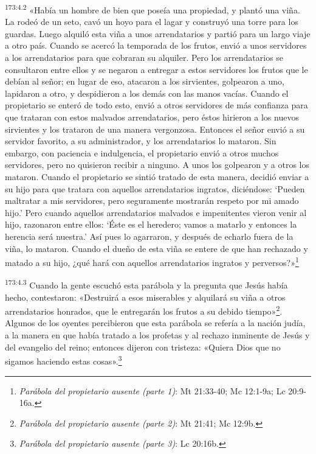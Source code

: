 \par
\textsuperscript{173:4.2} «Había un hombre de bien que poseía una propiedad, y plantó una viña. La rodeó de un seto, cavó un hoyo para el lagar y construyó una torre para los guardas. Luego alquiló esta viña a unos arrendatarios y partió para un largo viaje a otro país. Cuando se acercó la temporada de los frutos, envió a unos servidores a los arrendatarios para que cobraran su alquiler. Pero los arrendatarios se consultaron entre ellos y se negaron a entregar a estos servidores los frutos que le debían al señor; en lugar de eso, atacaron a los sirvientes, golpearon a uno, lapidaron a otro, y despidieron a los demás con las manos vacías. Cuando el propietario se enteró de todo esto, envió a otros servidores de más confianza para que trataran con estos malvados arrendatarios, pero éstos hirieron a los nuevos sirvientes y los trataron de una manera vergonzosa. Entonces el señor envió a su servidor favorito, a su administrador, y los arrendatarios lo mataron. Sin embargo, con paciencia e indulgencia, el propietario envió a otros muchos servidores, pero no quisieron recibir a ninguno. A unos los golpearon y a otros los mataron. Cuando el propietario se sintió tratado de esta manera, decidió enviar a su hijo para que tratara con aquellos arrendatarios ingratos, diciéndose: `Pueden maltratar a mis servidores, pero seguramente mostrarán respeto por mi amado hijo.' Pero cuando aquellos arrendatarios malvados e impenitentes vieron venir al hijo, razonaron entre ellos: `Éste es el heredero; vamos a matarlo y entonces la herencia será nuestra.' Así pues lo agarraron, y después de echarlo fuera de la viña, lo mataron. Cuando el dueño de esta viña se entere de que han rechazado y matado a su hijo, ¿qué hará con aquellos arrendatarios ingratos y perversos?»\footnote{\textit{Parábola del propietario ausente (parte 1)}: Mt 21:33-40; Mc 12:1-9a; Lc 20:9-16a.}

\par
\textsuperscript{173:4.3} Cuando la gente escuchó esta parábola y la pregunta que Jesús había hecho, contestaron: «Destruirá a esos miserables y alquilará su viña a otros arrendatarios honrados, que le entregarán los frutos a su debido tiempo»\footnote{\textit{Parábola del propietario ausente (parte 2)}: Mt 21:41; Mc 12:9b.}. Algunos de los oyentes percibieron que esta parábola se refería a la nación judía, a la manera en que había tratado a los profetas y al rechazo inminente de Jesús y del evangelio del reino; entonces dijeron con tristeza: «Quiera Dios que no sigamos haciendo estas cosas».\footnote{\textit{Parábola del propietario ausente (parte 3)}: Lc 20:16b.}

